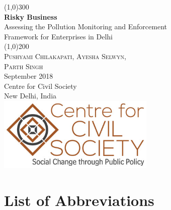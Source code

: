 \documentclass[a4paper, 12pt]{article}
\begin{document}
                    
                    \begin{titlepage}
                    	\begin{center}
                    	\line(1,0){300}\\
                    	[0.25in]
                    	\huge{\bfseries \textcolor{CCSbrown} {Risky Business}} \\
    	[0.5cm]
    	\large  {Assessing the Pollution Monitoring and Enforcement \\ Framework  for Enterprises in Delhi} \\
    	
                    	\line(1,0){200}\\
                    	[1in]
                    	\textsc{\Large Pushyami Chilakapati, Ayesha Selwyn, \\ Parth Singh} \\
                    	[1.5cm]
                    	{\Large September 2018} \\
                    	[2.0cm]
                    	{\LARGE Centre for Civil Society} \\
                    	[0.1mm]
                    	{\Large New Delhi, India} \\
    	[2.0cm]
    	\includegraphics[width = 75mm]{CCSlogo.jpg}
      
                    	\end{center}
                    \end{titlepage}
                    \tableofcontents
                    
                   \newpage
         
        \section*{List of Abbreviations}
\end{document}
